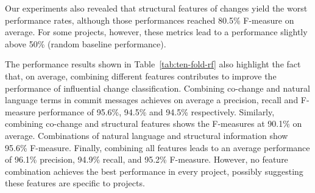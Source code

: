 Our experiments also revealed that structural features of changes yield the
worst performance rates, although those performances reached 80.5\%
F-measure on average. For some projects, however, these metrics lead to a
performance slightly above 50\% (random baseline performance).


The performance results shown in Table~\ref{tab:ten-fold-rf} also highlight
the fact that, on average, combining different features contributes to improve
the performance of influential change classification. Combining co-change and
natural language terms in commit messages achieves on average a precision, recall and
F-measure performance of 95.6\%, 94.5\% and 94.5\% respectively.
Similarly, combining co-change and structural features shows the F-measures at
90.1\% on average. Combinations of natural language and structural information
show 95.6\% F-measure. Finally, combining all features leads to an average
performance of 96.1\% precision, 94.9\% recall, and 95.2\% F-measure. However,
no feature combination achieves the best performance in every project, possibly
suggesting these features are specific to projects.



